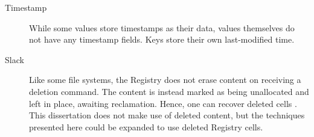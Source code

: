 \documentclass[11pt]{ucthesis}
\theoremstyle{plain}
\theoremstyle{definition}
\begin{document}
\begin{description}
%
%
\item[Timestamp] While some values store timestamps as their data, values themselves do not have any timestamp fields.  Keys store their own last-modified time.
\item[Slack] Like some file systems, the Registry does not erase content on receiving a deletion command.  The content is instead marked as being unallocated and left in place, awaiting reclamation.  Hence, one can recover deleted cells \cite{thomassen:msthesis08}.  This dissertation does not make use of deleted content, but the techniques presented here could be expanded to use deleted Registry cells.
\end{description}
\end{document}
